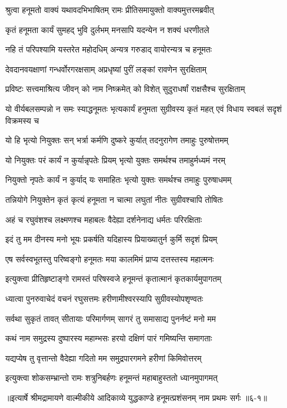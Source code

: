 
\twolineshloka
{श्रुत्वा हनूमतो वाक्यं यथावदभिभाषितम्}
{रामः प्रीतिसमायुक्तो वाक्यमुत्तरमब्रवीत्} %

\twolineshloka
{कृतं हनूमता कार्यं सुमहद् भुवि दुर्लभम्}
{मनसापि यदन्येन न शक्यं धरणीतले} %

\twolineshloka
{नहि तं परिपश्यामि यस्तरेत महोदधिम्}
{अन्यत्र गरुडाद् वायोरन्यत्र च हनूमतः} %

\twolineshloka
{देवदानवयक्षाणां गन्धर्वोरगरक्षसाम्}
{अप्रधृष्यां पुरीं लङ्कां रावणेन सुरक्षिताम्} %

\twolineshloka
{प्रविष्टः सत्त्वमाश्रित्य जीवन् को नाम निष्क्रमेत्}
{को विशेत् सुदुराधर्षां राक्षसैश्च सुरक्षिताम्} %

\threelineshloka
{यो वीर्यबलसम्पन्नो न समः स्याद्धनूमतः}
{भृत्यकार्यं हनुमता सुग्रीवस्य कृतं महत्}
{एवं विधाय स्वबलं सदृशं विक्रमस्य च} %

\twolineshloka
{यो हि भृत्यो नियुक्तः सन् भर्त्रा कर्मणि दुष्करे}
{कुर्यात् तदनुरागेण तमाहुः पुरुषोत्तमम्} %

\twolineshloka
{यो नियुक्तः परं कार्यं न कुर्यान्नृपतेः प्रियम्}
{भृत्यो युक्तः समर्थश्च तमाहुर्मध्यमं नरम्} %

\twolineshloka
{नियुक्तो नृपतेः कार्यं न कुर्याद् यः समाहितः}
{भृत्यो युक्तः समर्थश्च तमाहुः पुरुषाधमम्} %

\twolineshloka
{तन्नियोगे नियुक्तेन कृतं कृत्यं हनूमता}
{न चात्मा लघुतां नीतः सुग्रीवश्चापि तोषितः} %

\twolineshloka
{अहं च रघुवंशश्च लक्ष्मणश्च महाबलः}
{वैदेह्या दर्शनेनाद्य धर्मतः परिरक्षिताः} %

\twolineshloka
{इदं तु मम दीनस्य मनो भूयः प्रकर्षति}
{यदिहास्य प्रियाख्यातुर्न कुर्मि सदृशं प्रियम्} %

\twolineshloka
{एष सर्वस्वभूतस्तु परिष्वङ्गो हनूमतः}
{मया कालमिमं प्राप्य दत्तस्तस्य महात्मनः} %

\twolineshloka
{इत्युक्त्वा प्रीतिहृष्टाङ्गो रामस्तं परिषस्वजे}
{हनूमन्तं कृतात्मानं कृतकार्यमुपागतम्} %

\twolineshloka
{ध्यात्वा पुनरुवाचेदं वचनं रघुसत्तमः}
{हरीणामीश्वरस्यापि सुग्रीवस्योपशृण्वतः} %

\twolineshloka
{सर्वथा सुकृतं तावत् सीतायाः परिमार्गणम्}
{सागरं तु समासाद्य पुनर्नष्टं मनो मम} %

\twolineshloka
{कथं नाम समुद्रस्य दुष्पारस्य महाम्भसः}
{हरयो दक्षिणं पारं गमिष्यन्ति समागताः} %

\twolineshloka
{यद्यप्येष तु वृत्तान्तो वैदेह्या गदितो मम}
{समुद्रपारगमने हरीणां किमिवोत्तरम्} %

\twolineshloka
{इत्युक्त्वा शोकसम्भ्रान्तो रामः शत्रुनिबर्हणः}
{हनूमन्तं महाबाहुस्ततो ध्यानमुपागमत्} %


॥इत्यार्षे श्रीमद्रामायणे वाल्मीकीये आदिकाव्ये युद्धकाण्डे हनूमत्प्रशंसनम् नाम प्रथमः सर्गः ॥६-१॥
